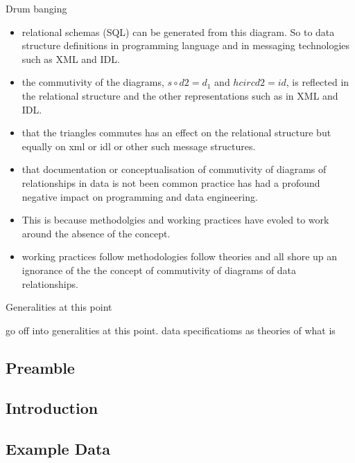 \begin{frame}{Drum banging}
\begin{itemize}
\item relational schemas (SQL) can be generated from this diagram. So to data structure definitions in programming language and in messaging technologies such as XML and IDL. 
\item the commutivity of the diagrams, $s \circ d2 = d_1$ and $h circ d2 =id$, is reflected in the relational structure and the other representations such as in XML and IDL.  
\item that the triangles commutes has an effect on the relational structure but equally on xml or idl or other such message structures. 
\item that documentation or conceptualisation of commutivity of diagrams of relationships in data is not been common practice has had a profound negative impact on programming and data engineering.
\item This is because methodolgies and working practices have evoled to work around the absence of the concept.
\item working practices follow methodologies  follow theories and all shore up an ignorance of the the concept of commutivity of diagrams of data relationships.
\end{itemize}
\end{frame}

\begin{frame}{Generalities at this point}

go off into generalities at this point. data specificatioms as theories of what is
\end{frame}






\iffalse
\subsection{Preamble}


\subsection{Introduction}


\subsection{Example Data}


